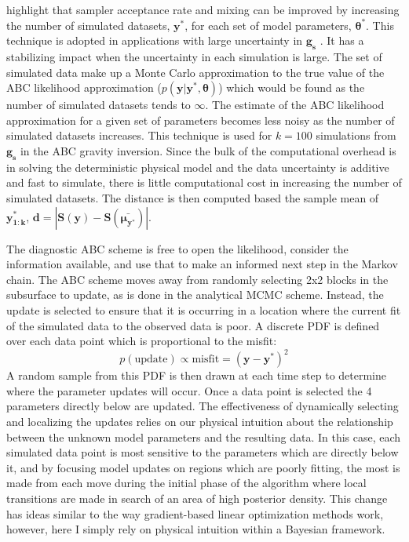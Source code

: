 \citet{Sisson2010a} highlight that sampler acceptance rate and mixing can be improved by increasing the number of simulated datasets, $\bm{y^*}$, for each set of model parameters, $\bm{\theta^*}$. This technique is adopted in applications with large uncertainty in $\bm{g_s}$ \citep{Ratmann2009,Wood2010}. It has a stabilizing impact when the uncertainty in each simulation is large. The set of simulated data make up a Monte Carlo approximation to the true value of the ABC likelihood approximation ($p(\bm{y}|\bm{y^*},\bm{\theta})$) which would be found as the number of simulated datasets tends to $\infty$. The estimate of the ABC likelihood approximation for a given set of parameters becomes less noisy as the number of simulated datasets increases. This technique is used for $k = 100$ simulations from $\bm{g_s}$ in the ABC gravity inversion. Since the bulk of the computational overhead is in solving the deterministic physical model and the data uncertainty is additive and fast to simulate, there is little computational cost in increasing  the number of simulated datasets. The distance is then computed based the sample mean of $\bm{y^*_{1:k}}$, $\bm{d} = |\bm{S}(\bm{y})-\bm{S}(\bm{\bar{\mu_{y^*}}})|$. \par

The diagnostic ABC scheme is free to open the likelihood, consider the information available, and use that to make an informed next step in the Markov chain. The ABC scheme moves away from randomly selecting 2x2 blocks in the subsurface to update, as is done in the analytical MCMC scheme. Instead, the update is selected to ensure that it is occurring in a location where the current fit of the simulated data to the observed data is poor. A discrete PDF is defined over each data point which is proportional to the misfit:
\begin{equation}
	p(\text{update}) \propto \text{misfit} = (\bm{y}-\bm{y^*})^2
	\label{misfit}
\end{equation}
A random sample from this PDF is then drawn at each time step to determine where the parameter updates will occur. Once a data point is selected the 4 parameters directly below are updated. The effectiveness of dynamically selecting and localizing the updates relies on our physical intuition about the relationship between the unknown model parameters and the resulting data. In this case, each simulated data point is most sensitive to the parameters which are directly below it, and by focusing model updates on regions which are poorly fitting, the most is made from each move during the initial phase of the algorithm where local transitions are made in search of an area of high posterior density. This change has ideas similar to the way gradient-based linear optimization methods work, however, here I simply rely on physical intuition within a Bayesian framework. \par

